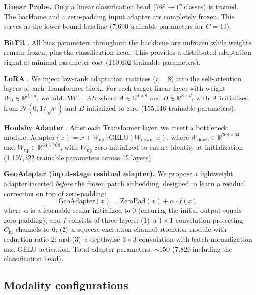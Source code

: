 \documentclass{article}
\begin{document}
\textbf{Linear Probe.} Only a linear classification head ($768 \to C$ classes) is trained. The backbone and a zero-padding input adapter are completely frozen. This serves as the lower-bound baseline (7,690 trainable parameters for $C=10$).

\textbf{BitFit} \citep{zaken2022bitfit}. All bias parameters throughout the backbone are unfrozen while weights remain frozen, plus the classification head. This provides a distributed adaptation signal at minimal parameter cost (110,602 trainable parameters).

\textbf{LoRA} \citep{hu2022lora}. We inject low-rank adaptation matrices ($r=8$) into the self-attention layers of each Transformer block. For each target linear layer with weight $W_0 \in \mathbb{R}^{d \times d}$, we add $\Delta W = AB$ where $A \in \mathbb{R}^{d \times 8}$ and $B \in \mathbb{R}^{8 \times d}$, with $A$ initialized from $\mathcal{N}(0, 1/\sqrt{r})$ and $B$ initialized to zero (155,146 trainable parameters).

\textbf{Houlsby Adapter} \citep{houlsby2019adapter}. After each Transformer layer, we insert a bottleneck module: $\text{Adapter}(x) = x + W_{\text{up}} \cdot \text{GELU}(W_{\text{down}} \cdot x)$, where $W_{\text{down}} \in \mathbb{R}^{768 \times 64}$ and $W_{\text{up}} \in \mathbb{R}^{64 \times 768}$, with $W_{\text{up}}$ zero-initialized to ensure identity at initialization (1,197,322 trainable parameters across 12 layers).

\textbf{GeoAdapter (input-stage residual adapter).} We propose a lightweight adapter inserted \emph{before} the frozen patch embedding, designed to learn a residual correction on top of zero-padding:
\begin{equation}
\text{GeoAdapter}(x) = \text{ZeroPad}(x) + \alpha \cdot f(x)
\end{equation}
where $\alpha$ is a learnable scalar initialized to 0 (ensuring the initial output equals zero-padding), and $f$ consists of three layers: (1)~a $1 \times 1$ convolution projecting $C_{\text{in}}$ channels to 6; (2)~a squeeze-excitation channel attention module \citep{hu2022se} with reduction ratio 2; and (3)~a depthwise $3 \times 3$ convolution with batch normalization and GELU activation. Total adapter parameters: $\sim$150 (7,826 including the classification head).

\subsection{Modality configurations}
\end{document}
